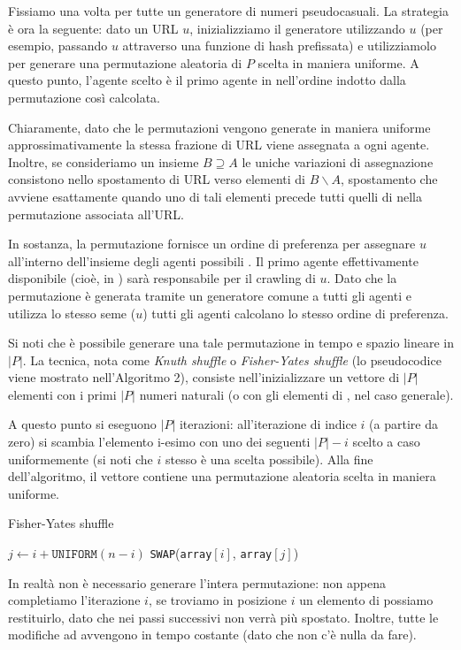 Fissiamo una volta per tutte un generatore di numeri pseudocasuali. La strategia è ora la seguente: dato un URL $u$, inizializziamo il generatore utilizzando $u$ (per esempio, passando $u$ attraverso una funzione di hash prefissata) e utilizziamolo per generare una permutazione aleatoria di $P$ scelta in maniera uniforme. A questo punto, l'agente scelto è il primo agente in  nell'ordine indotto dalla permutazione così calcolata.

Chiaramente, dato che le permutazioni vengono generate in maniera uniforme approssimativamente la stessa frazione di URL viene assegnata a ogni agente. Inoltre, se consideriamo un insieme $B \supseteq A$ le uniche variazioni di assegnazione consistono nello spostamento di URL verso elementi di $B \smallsetminus A$, spostamento che avviene esattamente quando uno di tali elementi precede tutti quelli di  nella permutazione associata all'URL.

In sostanza, la permutazione fornisce un ordine di preferenza per assegnare $u$ all'interno dell'insieme degli agenti possibili . Il primo agente effettivamente disponibile (cioè, in ) sarà responsabile per il crawling di $u$. Dato che la permutazione è generata tramite un generatore comune a tutti gli agenti e utilizza lo stesso seme ($u$) tutti gli agenti calcolano lo stesso ordine di preferenza.

Si noti che è possibile generare una tale permutazione in tempo e spazio lineare in $|P|$. La tecnica, nota come \textit{Knuth shuffle} o \textit{Fisher-Yates shuffle} (lo pseudocodice viene mostrato nell'Algoritmo 2), consiste nell'inizializzare un vettore di $|P|$ elementi con i primi $|P|$ numeri naturali (o con gli elementi di , nel caso generale).

A questo punto si eseguono $|P|$ iterazioni: all'iterazione di indice $i$ (a partire da zero) si scambia l'elemento i-esimo con uno dei seguenti $|P| - i$ scelto a caso uniformemente (si noti che $i$ stesso è una scelta possibile). Alla fine dell'algoritmo, il vettore contiene una permutazione aleatoria scelta in maniera uniforme.
\begin{algorithm}
	\caption{Fisher-Yates shuffle}
	\begin{algorithmic}
		\State $j \gets i + \texttt{UNIFORM}(n - i)$
		\State \texttt{SWAP}(\texttt{array}$[i]$, \texttt{array}$[j]$)
		\EndFor
	\end{algorithmic}
\end{algorithm}
In realtà non è necessario generare l'intera permutazione: non appena completiamo l'iterazione $i$, se troviamo in posizione $i$ un elemento di  possiamo restituirlo, dato che nei passi successivi non verrà più spostato. Inoltre, tutte le modifiche ad  avvengono in tempo costante (dato che non c'è nulla da fare).
